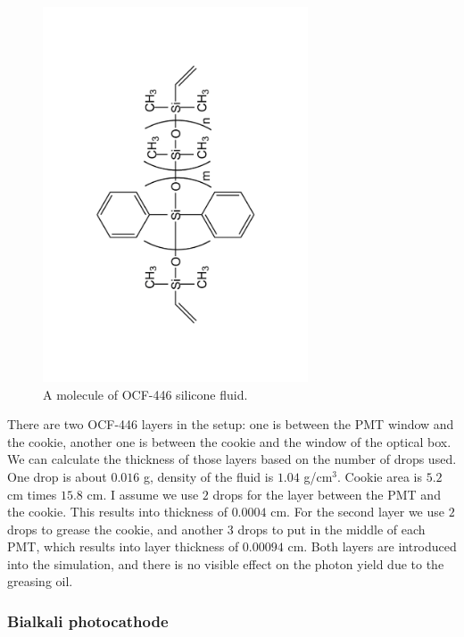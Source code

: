 \begin{figure}[htb]
\centering
\includegraphics[angle=270,width=0.7\textwidth]{pics/ocf.pdf}
\caption{\label{pic:ocf}
A molecule of OCF-446 silicone fluid.
}
\end{figure}

There are two OCF-446 layers in the setup: one is between the PMT window and the cookie, another one is between the cookie and the window of the optical box. We can calculate the thickness of those layers based on the number of drops used. One drop is about $0.016$ g, density of the fluid is $1.04$ g/cm$^{3}$. Cookie area is $5.2$ cm times $15.8$ cm. I assume we use $2$ drops for the layer between the PMT and the cookie. This results into thickness of $0.0004$ cm. For the second layer we use $2$ drops to grease the cookie, and another $3$ drops to put in the middle of each PMT, which results into layer thickness of $0.00094$ cm. Both layers are introduced into the simulation, and there is no visible effect on the photon yield due to the greasing oil.

\subsubsection*{Bialkali photocathode}


